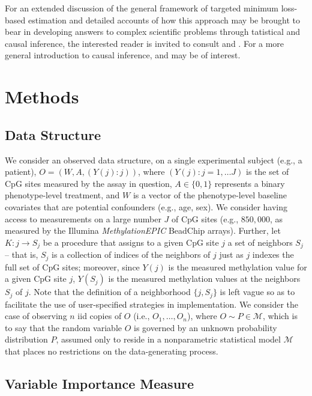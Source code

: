 \documentclass[9pt,a4paper,]{extarticle}
\theoremstyle{definition}
\theoremstyle{definition}
\theoremstyle{definition}
\theoremstyle{remark}
\begin{document}
For an extended discussion of the general framework of targeted minimum
loss-based estimation and detailed accounts of how this approach may be brought
to bear in developing answers to complex scientific problems through tatistical
and causal inference, the interested reader is invited to consult
\citet{vdl2011targeted} and \citet{vdl2018targeted}. For a more general introduction to causal
inference, \citet{pearl2009causality} and \citet{hernan2018causal} may be of interest.

\hypertarget{methods}{%
\section{Methods}\label{methods}}

\hypertarget{data-structure}{%
\subsection{Data Structure}\label{data-structure}}

We consider an observed data structure, on a single experimental subject (e.g.,
a patient), \(O = (W, A, (Y(j) : j))\), where \((Y(j) : j = 1, \ldots J)\) is the
set of CpG sites measured by the assay in question, \(A \in \{0, 1\}\) represents
a binary phenotype-level treatment, and \(W\) is a vector of the phenotype-level
baseline covariates that are potential confounders (e.g., age, sex). We consider
having access to measurements on a large number \(J\) of CpG sites (e.g.,
\(850,000\), as measured by the Illumina \emph{MethylationEPIC} BeadChip arrays).
Further, let \(K: j \to S_j\) be a procedure that assigns to a given CpG site \(j\)
a set of neighbors \(S_j\) -- that is, \(S_j\) is a collection of indices of the
neighbors of \(j\) just as \(j\) indexes the full set of CpG sites; moreover, since
\(Y(j)\) is the measured methylation value for a given CpG site \(j\), \(Y(S_j)\) is
the measured methylation values at the neighbors \(S_j\) of \(j\). Note that the
definition of a neighborhood \(\{j, S_j\}\) is left vague so as to facilitate the
use of user-specified strategies in implementation. We consider the case of
observing \(n\) iid copies of \(O\) (i.e., \(O_1, \ldots, O_n\)), where \(O \sim P \in \mathcal{M}\), which is to say that the random variable \(O\) is governed by an
unknown probability distribution \(P\), assumed only to reside in a nonparametric
statistical model \(\mathcal{M}\) that places no restrictions on the
data-generating process.

\hypertarget{variable-importance-measure}{%
\subsection{Variable Importance Measure}\label{variable-importance-measure}}
\end{document}
